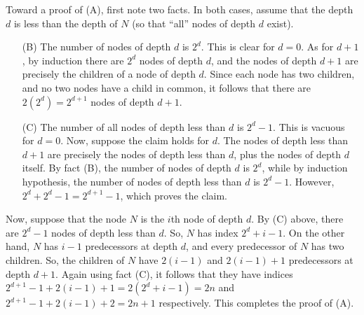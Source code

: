 \documentclass[
]{article}
\begin{document}
Toward a proof of (A), first note two facts.  In both cases, assume that the depth $d$ is less than the depth of $N$ (so that ``all'' nodes of depth $d$ exist).
\begin{itemize}
\item[(B)] The number of nodes of depth $d$ is $2^d$. This is clear for $d=0$.  As for $d+1$, by induction there are $2^d$ nodes of depth $d$, and the nodes of depth $d+1$ are precisely the children of a node of depth $d$.  Since each node has two children, and no two nodes have a child in common, it follows that there are $2(2^d)=2^{d+1}$ nodes of depth $d+1$.
\item[(C)] The number of all nodes of depth less than $d$ is $2^{d}-1$.  This is vacuous for $d=0$. Now, suppose the claim holds for $d$.  The nodes of depth less than $d+1$ are precisely the nodes of depth less than $d$, plus the nodes of depth $d$ itself.  By fact (B), the number of nodes of depth $d$ is $2^{d}$, while by induction hypothesis, the number of nodes of depth less than $d$ is $2^d-1$.  However, $2^{d} + 2^{d} - 1 = 2^{d+1}-1$, which proves the claim.
\end{itemize}
Now, suppose that the node $N$ is the $i$th node of depth $d$.  
By (C) above, there are $2^d-1$ nodes of depth less than $d$.
So, $N$ has index $2^d+i-1$.  On the other hand, $N$ has $i-1$ predecessors at depth $d$,
and every predecessor of $N$ has two children.
So, the children of $N$ have $2(i-1)$ and $2(i-1)+1$ predecessors at depth $d+1$.
Again using fact (C), it follows that they have indices
$2^{d+1}-1+2(i-1)+1=2(2^d+i-1)=2n$ and $2^{d+1}-1+2(i-1) + 2=2n+1$ respectively.  This completes the proof of (A).
\end{document}
